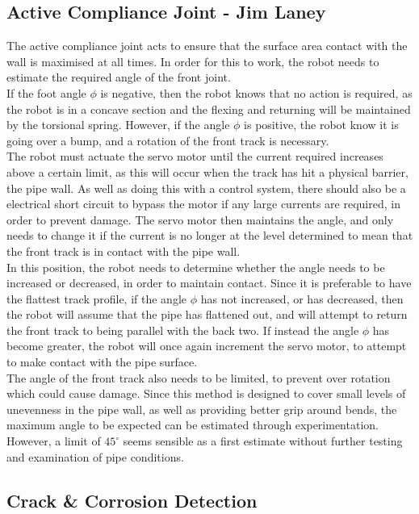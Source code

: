 \documentclass[11pt]{article}		%
\begin{document}
		\subsection[Active Compliance Joint]{Active Compliance Joint - Jim Laney}
		
		The active compliance joint acts to ensure that the surface area contact with the wall is maximised at all times.
		In order for this to work, the robot needs to estimate the required angle of the front joint.
		\\
		If the foot angle $\phi$ is negative, then the robot knows that no action is required, as the robot is in a concave section and the flexing and returning will be maintained by the torsional spring.
		However, if the angle $\phi$ is positive, the robot know it is going over a bump, and a rotation of the front track is necessary.
		\\
		The robot must actuate the servo motor until the current required increases above a certain limit, as this will occur when the track has hit a physical barrier, the pipe wall.
		As well as doing this with a control system, there should also be a electrical short circuit to bypass the motor if any large currents are required, in order to prevent damage.
		The servo motor then maintains the angle, and only needs to change it if the current is no longer at the level determined to mean that the front track is in contact with the pipe wall.
		\\
		In this position, the robot needs to determine whether the angle needs to be increased or decreased, in order to maintain contact.
		Since it is preferable to have the flattest track profile, if the angle $\phi$ has not increased, or has decreased, then the robot will assume that the pipe has flattened out, and will attempt to return the front track to being parallel with the back two.
		If instead the angle $\phi$ has become greater, the robot will once again increment the servo motor, to attempt to make contact with the pipe surface.
		\\
		The angle of the front track also needs to be limited, to prevent over rotation which could cause damage.
		Since this method is designed to cover small levels of unevenness in the pipe wall, as well as providing better grip around bends, the maximum angle to be expected can be estimated through experimentation.
		However, a limit of $45^\circ$ seems sensible as a first estimate without further testing and examination of pipe conditions.
				
		\subsection{Crack \& Corrosion Detection}
		
\end{document}
